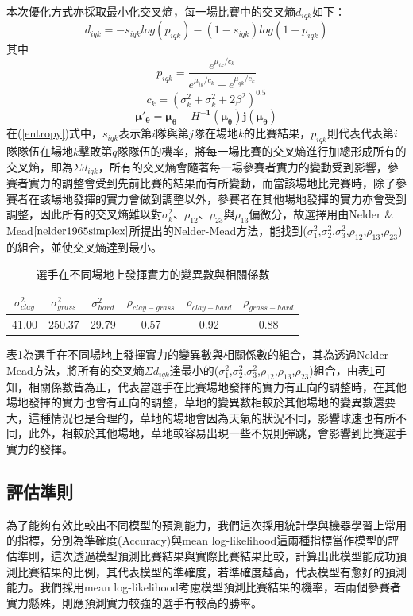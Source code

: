 \documentclass[12pt]{article}
\begin{document}
本次優化方式亦採取最小化交叉熵，每一場比賽中的交叉熵$d_{iqk}$如下：
\begin{equation}
d_{iqk} = -s_{iqk}log(p_{iqk})-(1-s_{iqk})log(1-p_{iqk})
\label{entropy}
\end{equation}
其中
\[
p_{iqk} =  \dfrac{e^{\mu_{ik}/c_k}}{e^{\mu_{ik}/c_k}+e^{\mu_{qk}/c_k}}
\]
\[
c_{k} = (\sigma^2_k + \sigma^2_k + 2\beta^2)^{0.5}
\]
\[
\boldsymbol{\mu'_{\theta} = \mu_{\theta} - \textit{H}^{-1}(\mu_{\theta})j(\mu_{\theta})}
\]
在(\ref{entropy})式中，$s_{iqk}$表示第$i$隊與第$j$隊在場地$k$的比賽結果，$p_{iqk}$則代表代表第$i$隊隊伍在場地$k$擊敗第$q$隊隊伍的機率，將每一場比賽的交叉熵進行加總形成所有的交叉熵，即為$\Sigma{d_{iqk}}$，所有的交叉熵會隨著每一場參賽者實力的變動受到影響，參賽者實力的調整會受到先前比賽的結果而有所變動，而當該場地比完賽時，除了參賽者在該場地發揮的實力會做到調整以外，參賽者在其他場地發揮的實力亦會受到調整，因此所有的交叉熵難以對$\sigma^2_k$、$\rho_{12}$、$\rho_{23}$與$\rho_{13}$偏微分，故選擇用由Nelder \& Mead$\cite{nelder1965simplex}$所提出的Nelder-Mead方法，能找到($\sigma^2_1$,$\sigma^2_2$,$\sigma^2_3$,$\rho_{12}$,$\rho_{13}$,$\rho_{23}$)的組合，並使交叉熵達到最小。

\begin{table}[h!]
\caption{選手在不同場地上發揮實力的變異數與相關係數}
\centering
\begin{tabular}[center]{cccccc}
\hline
$\sigma^2_{clay}$ & $\sigma^2_{grass}$ & $\sigma^2_{hard}$ & $\rho_{clay-grass}$ & $\rho_{clay-hard}$&$\rho_{grass-hard}$\\
\hline
41.00 & 250.37 & 29.79 & 0.57&0.92&0.88\\
\hline
\end{tabular}
\label{table:surface}
\end{table}

表\ref{table:surface}為選手在不同場地上發揮實力的變異數與相關係數的組合，其為透過Nelder-Mead方法，將所有的交叉熵$\Sigma{d_{iqk}}$達最小的($\sigma^2_1$,$\sigma^2_2$,$\sigma^2_3$,$\rho_{12}$,$\rho_{13}$,$\rho_{23}$)組合，由表\ref{table:surface}可知，相關係數皆為正，代表當選手在比賽場地發揮的實力有正向的調整時，在其他場地發揮的實力也會有正向的調整，草地的變異數相較於其他場地的變異數還要大，這種情況也是合理的，草地的場地會因為天氣的狀況不同，影響球速也有所不同，此外，相較於其他場地，草地較容易出現一些不規則彈跳，會影響到比賽選手實力的發揮。
\subsection{評估準則}
為了能夠有效比較出不同模型的預測能力，我們這次採用統計學與機器學習上常用的指標，分別為準確度(Accuracy)與mean log-likelihood這兩種指標當作模型的評估準則，這次透過模型預測比賽結果與實際比賽結果比較，計算出此模型能成功預測比賽結果的比例，其代表模型的準確度，若準確度越高，代表模型有愈好的預測能力。我們採用mean log-likelihood考慮模型預測比賽結果的機率，若兩個參賽者實力懸殊，則應預測實力較強的選手有較高的勝率。
\end{document}
